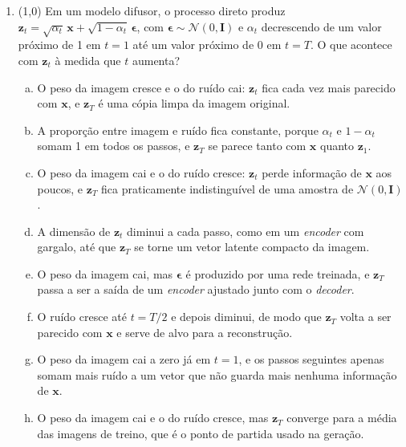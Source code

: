 \documentclass[11pt,a4paper]{article}
\begin{document}
\begin{enumerate}[1)]
\item (1{,}0) Em um modelo difusor, o processo direto produz $\mathbf{z}_t = \sqrt{\alpha_t}\,\mathbf{x} + \sqrt{1 - \alpha_t}\,\boldsymbol{\epsilon}$, com $\boldsymbol{\epsilon} \sim \mathcal{N}(0, \mathbf{I})$ e $\alpha_t$ decrescendo de um valor próximo de 1 em $t = 1$ até um valor próximo de 0 em $t = T$. O que acontece com $\mathbf{z}_t$ à medida que $t$ aumenta?
\begin{enumerate}[a)]
    \item O peso da imagem cresce e o do ruído cai: $\mathbf{z}_t$ fica cada vez mais parecido com $\mathbf{x}$, e $\mathbf{z}_T$ é uma cópia limpa da imagem original.
    \item A proporção entre imagem e ruído fica constante, porque $\alpha_t$ e $1 - \alpha_t$ somam 1 em todos os passos, e $\mathbf{z}_T$ se parece tanto com $\mathbf{x}$ quanto $\mathbf{z}_1$.
    \item O peso da imagem cai e o do ruído cresce: $\mathbf{z}_t$ perde informação de $\mathbf{x}$ aos poucos, e $\mathbf{z}_T$ fica praticamente indistinguível de uma amostra de $\mathcal{N}(0, \mathbf{I})$.
    \item A dimensão de $\mathbf{z}_t$ diminui a cada passo, como em um \textit{encoder} com gargalo, até que $\mathbf{z}_T$ se torne um vetor latente compacto da imagem.
    \item O peso da imagem cai, mas $\boldsymbol{\epsilon}$ é produzido por uma rede treinada, e $\mathbf{z}_T$ passa a ser a saída de um \textit{encoder} ajustado junto com o \textit{decoder}.
    \item O ruído cresce até $t = T/2$ e depois diminui, de modo que $\mathbf{z}_T$ volta a ser parecido com $\mathbf{x}$ e serve de alvo para a reconstrução.
    \item O peso da imagem cai a zero já em $t = 1$, e os passos seguintes apenas somam mais ruído a um vetor que não guarda mais nenhuma informação de $\mathbf{x}$.
    \item O peso da imagem cai e o do ruído cresce, mas $\mathbf{z}_T$ converge para a média das imagens de treino, que é o ponto de partida usado na geração.
\end{enumerate}

\end{enumerate}
\end{document}
